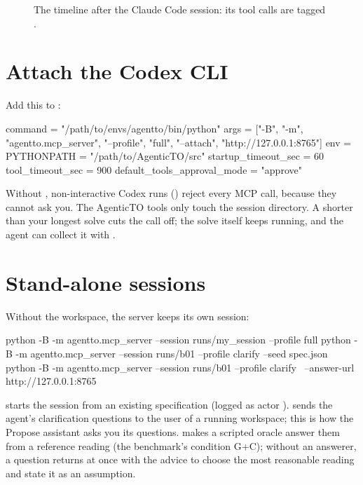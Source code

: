 \begin{figure}[h]
\caption{The timeline after the Claude Code session: its tool calls are tagged .}
\label{fig:attachtimeline}
\end{figure}

\section{Attach the Codex CLI}
Add this to :

\begin{tomlcode}
command = "/path/to/envs/agentto/bin/python"
args = ["-B", "-m", "agentto.mcp_server", "--profile", "full",
        "--attach", "http://127.0.0.1:8765"]
env = { PYTHONPATH = "/path/to/AgenticTO/src" }
startup_timeout_sec = 60
tool_timeout_sec = 900
default_tools_approval_mode = "approve"
\end{tomlcode}

\begin{warnbox}
Without , non-interactive Codex runs () reject every MCP
call, because they cannot ask you. The AgenticTO tools only touch the session directory. A 
shorter than your longest solve cuts the call off; the solve itself keeps running, and the agent can collect it with
.
\end{warnbox}

\section{Stand-alone sessions}
Without the workspace, the server keeps its own session:

\begin{shell}
python -B -m agentto.mcp_server --session runs/my_session --profile full
python -B -m agentto.mcp_server --session runs/b01 --profile clarify --seed spec.json
python -B -m agentto.mcp_server --session runs/b01 --profile clarify \
    --answer-url http://127.0.0.1:8765
\end{shell}

 starts the session from an existing specification (logged as actor ). 
sends the agent's clarification questions to the user of a running workspace; this is how the Propose assistant asks
you its questions. \code{--oracle} makes a scripted oracle answer them from a reference reading (the benchmark's
condition G+C); without an answerer, a question returns at once with the advice to choose the most reasonable reading
and state it as an assumption.

